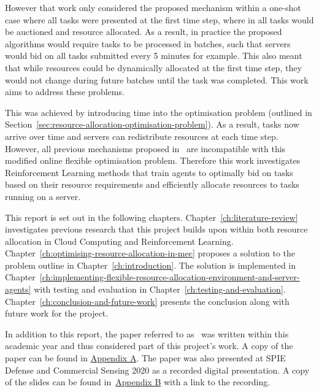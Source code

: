 However that work only considered the proposed mechanism within a one-shot case where all tasks were presented at the
first time step, where in all tasks would be auctioned and resource allocated. As a result, in practice the proposed
algorithms would require tasks to be processed in batches, such that servers would bid on all tasks submitted every 5
minutes for example. This also meant that while resources could be dynamically allocated at the first time step, they
would not change during future batches until the task was completed. This work aims to address these problems.

This was achieved by introducing time into the optimisation problem (outlined in
Section~\ref{sec:resource-allocation-optimisation-problem}). As a result, tasks now arrive over time and servers can
redistribute resources at each time step. However, all previous mechanisms proposed in~\cite{FlexibleResourceAllocation}
are incompatible with this modified online flexible optimisation problem. Therefore this work investigates Reinforcement
Learning methods that train agents to optimally bid on tasks based on their resource requirements and efficiently
allocate resources to tasks running on a server.

This report is set out in the following chapters. Chapter~\ref{ch:literature-review} investigates previous research
that this project builds upon within both resource allocation in Cloud Computing and Reinforcement Learning.
Chapter~\ref{ch:optimising-resource-allocation-in-mec} proposes a solution to the problem outline in
Chapter~\ref{ch:introduction}.
The solution is implemented in Chapter~\ref{ch:implementing-flexible-resource-allocation-environment-and-server-agents}
with testing and evaluation in Chapter~\ref{ch:testing-and-evaluation}. Chapter~\ref{ch:conclusion-and-future-work}
presents the conclusion along with future work for the project.

In addition to this report, the paper referred to as~\cite{FlexibleResourceAllocation} was written within this
academic year and thus considered part of this project's work. A copy of the paper can be found in
\hyperref[app:paper]{Appendix A}. The paper was also presented at SPIE Defense and Commercial
Sensing 2020 as a recorded digital presentation. A copy of the slides can be found
in~\hyperref[app:spie-presentation]{Appendix B} with a link to the recording.
